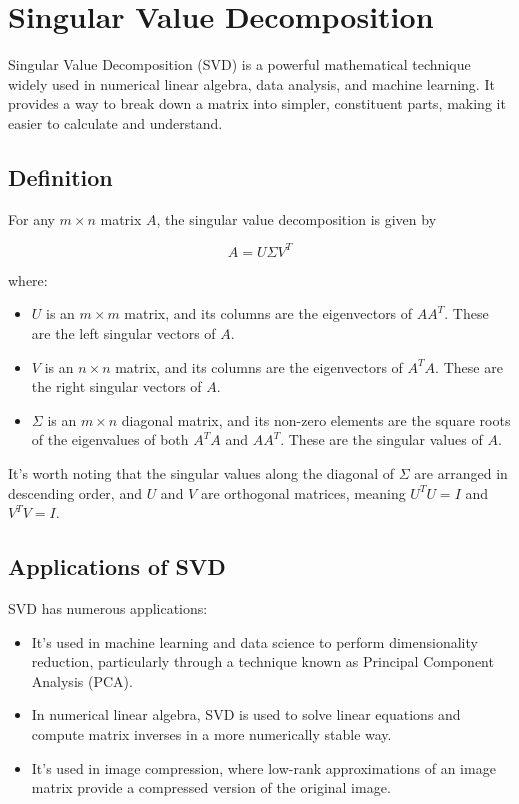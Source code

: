 \chapter{Singular Value Decomposition}

Singular Value Decomposition (SVD) is a powerful mathematical technique widely used in numerical linear algebra, data analysis, and machine learning. It provides a way to break down a matrix into simpler, constituent parts, making it easier to calculate and understand.

\section{Definition}

For any $m \times n$ matrix $A$, the singular value decomposition is given by

\begin{equation}
A = U \Sigma V^T
\end{equation}

where:

\begin{itemize}
\item $U$ is an $m \times m$ matrix, and its columns are the eigenvectors of $AA^T$. These are the left singular vectors of $A$.

\item $V$ is an $n \times n$ matrix, and its columns are the eigenvectors of $A^TA$. These are the right singular vectors of $A$.

\item $\Sigma$ is an $m \times n$ diagonal matrix, and its non-zero elements are the square roots of the eigenvalues of both $A^TA$ and $AA^T$. These are the singular values of $A$.
\end{itemize}

It's worth noting that the singular values along the diagonal of $\Sigma$ are arranged in descending order, and $U$ and $V$ are orthogonal matrices, meaning $U^TU = I$ and $V^TV = I$.

\section{Applications of SVD}

SVD has numerous applications:

\begin{itemize}
\item It's used in machine learning and data science to perform dimensionality reduction, particularly through a technique known as Principal Component Analysis (PCA).

\item In numerical linear algebra, SVD is used to solve linear equations and compute matrix inverses in a more numerically stable way.

\item It's used in image compression, where low-rank approximations of an image matrix provide a compressed version of the original image.
\end{itemize}

